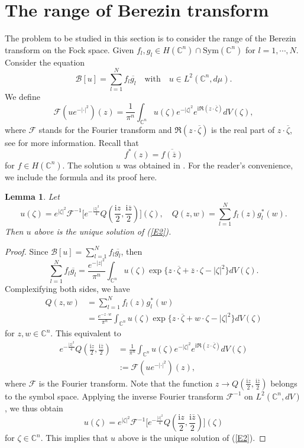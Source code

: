 \documentclass[11pt,reqno]{amsart}
\newtheorem{lemma}[theorem]{Lemma}
\theoremstyle{definition}
\begin{document}
\section{The range of Berezin transform}\label{s2}
The problem to be studied in this section is to consider the range of the Berezin transform on the Fock space.
Given $f_l,g_l\in H(\mathbb{C}^n)\cap \text{Sym}(\mathbb{C}^n)$ for $l=1,\cdots,N$. Consider the equation
\begin{equation}\label{E2}
\mathcal{B}[u]=\sum_{l=1}^Nf_{l}\overline{g_l}\quad\text{with}\quad u\in L^{2}(\mathbb{C}^n,d\mu).
\end{equation}
We define $$\mathcal{F}(ue^{-|\cdot|^2})(z)=\frac{1}{\pi^n}\int_{\mathbb{C}^n}
u(\zeta)e^{-|\zeta|^2}e^{\mathrm{i}\Re(z\cdot\overline{\zeta})}dV(\zeta),$$
where $\mathcal{F}$ stands for the Fourier transform and $\Re(z\cdot\overline{\zeta})$ is the real part of $z\cdot\overline{\zeta}$, see \cite{Bauer} for more information. Recall that $$f^*(z)=\overline{f(\overline{z})}$$ for $f\in H(\mathbb{C}^n).$ The solution $u$ was obtained in \cite{Bauer}. For the reader's
convenience, we include the formula and its proof here.
\begin{lemma}\label{l1}
Let $$u(\zeta)=e^{|\zeta|^2}\mathcal{F}^{-1}\bigg[e^{-\frac{|z|^2}{4}}
Q(\frac{\mathrm{i}z}{2},\frac{\mathrm{i}\overline{z}}{2})\bigg](\zeta),\quad Q(z,w)=\sum_{l=1}^N f_{l}(z)g_l^*(w).$$
Then $u$ above is the unique solution of (\ref{E2}).
\end{lemma}
\begin{proof}
Since $\mathcal{B}[u]=\sum_{l=1}^Nf_{l}\overline{g_l}$, then
$$\sum_{l=1}^Nf_{l}\overline{g_l}=\frac{e^{-|z|^2}}{\pi^n}\int_{\mathbb{C}^n}u(\zeta)\exp\{z\cdot\overline{\zeta}+\overline{z}\cdot\zeta-|\zeta|^2\}dV(\zeta).$$
Complexifying both sides, we have
\begin{align*}
Q(z,w)&=\sum_{l=1}^Nf_l(z)g_l^*(w)\\
&=\frac{e^{-z\cdot w}}{\pi^n}\int_{\mathbb{C}^n}u(\zeta)\exp\{z\cdot\overline{\zeta}+w\cdot\zeta-|\zeta|^2\}dV(\zeta)
\end{align*}
for $z,w\in \mathbb{C}^n$. This equivalent to
\begin{align*}
e^{-\frac{|z|^2}{4}}Q(\frac{\mathrm{i}z}{2},\frac{\mathrm{i}\overline{z}}{2})&
=\frac{1}{\pi^n}\int_{\mathbb{C}^n}u(\zeta)e^{-|\zeta|^2}e^{\mathrm{i}\Re(z\cdot\overline{\zeta})}dV(\zeta)\\
&:=\mathcal{F}(ue^{-|\cdot|^2})(z),
\end{align*}
where $\mathcal{F}$ is the Fourier transform. Note that the function $z\rightarrow Q(\frac{\mathrm{i}z}{2},\frac{\mathrm{i}\overline{z}}{2})$ belongs to the symbol space. Applying the inverse Fourier transform $\mathcal{F}^{-1}$  on $L^{2}(\mathbb{C}^n,dV)$, we thus obtain
$$u(\zeta)=e^{|\zeta|^2}\mathcal{F}^{-1}\bigg[e^{-\frac{|z|^2}{4}}Q(\frac{\mathrm{i}z}{2},\frac{\mathrm{i}\overline{z}}{2})\bigg](\zeta)$$ for
$\zeta\in \mathbb{C}^n$. This implies that $u$ above is the unique solution of (\ref{E2}).
\end{proof}
\end{document}
